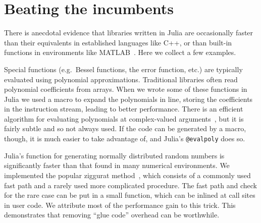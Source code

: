 




\section{Beating the incumbents}
\label{sec:beating}

There is anecdotal evidence that libraries written in Julia are occasionally
faster than their equivalents in established languages like C++, or
than built-in functions in environments like MATLAB~\cite{matlab}.
Here we collect a few examples.

Special functions (e.g.\ Bessel functions, the error function, etc.) are
typically evaluated using polynomial approximations.
Traditional libraries often read polynomial coefficients from arrays.
When we wrote some of these functions in Julia we used a macro
to expand the polynomials in line, storing the coefficients in the
instruction stream, leading to better performance.
There is an efficient algorithm for evaluating polynomials at complex-valued
arguments~\cite{knuth1969art}, but it is fairly subtle and so not always
used.
If the code can be generated by a macro, though, it is much easier to take
advantage of, and Julia's \texttt{@evalpoly} does so.


Julia's function for generating normally distributed random numbers is
significantly faster than that found in many numerical environments.
We implemented the popular ziggurat method~\cite{Marsaglia:Tsang:2000:JSSOBK:v05i08},
which consists of a commonly used fast path and a rarely used more complicated
procedure.
The fast path and check for the rare case can be put in a small function,
which can be inlined at call sites in user code.
We attribute most of the performance gain to this trick.
This demonstrates that removing ``glue code'' overhead can be worthwhile.

